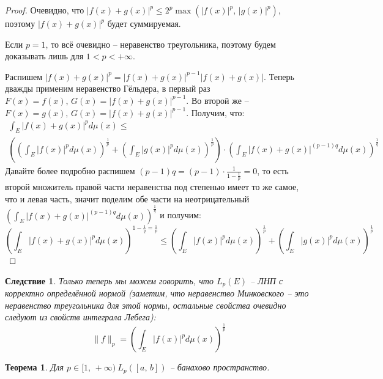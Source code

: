 \documentclass[a4paper,12pt]{article}
\renewcommand{\leq}{\ensuremath{\leqslant}}
\theoremstyle{plain}
\newtheorem{theorem}{Теорема}[section]
\newtheorem*{corollary}{Следствие}
\theoremstyle{definition}
\theoremstyle{remark}
\begin{document}
\begin{proof}
	Очевидно, что $|f(x) + g(x)|^p \leq 2^p \max(|f(x)|^p,\, |g(x)|^p)$, поэтому $|f(x) + g(x)|^p$ будет суммируемая.

	Если $p = 1$, то всё очевидно -- неравенство треугольника, поэтому будем доказывать лишь для $1 < p < +\infty$.

	Распишем $|f(x) + g(x)|^p = |f(x) + g(x)|^{p - 1}|f(x) + g(x)|$. Теперь дважды применим неравенство Гёльдера, в первый раз $F(x) = f(x),\, G(x) = |f(x) + g(x)|^{p - 1}$. Во второй же -- $F(x) = g(x),\, G(x) = |f(x) + g(x)|^{p - 1}$. Получим, что:
	\begin{align*}
		\int_E |f(x) + g(x)|^p d\mu(x) \leq \\
		\left(\left(\int_E |f(x)|^pd\mu(x)\right)^{\frac{1}{p}} + \left(\int_E |g(x)|^pd\mu(x)\right)^{\frac{1}{p}}\right) \cdot \left(\int_E |f(x) + g(x)|^{(p - 1)q}d\mu(x)\right)^{\frac{1}{q}}
	\end{align*}
	Давайте более подробно распишем $(p - 1)q = (p - 1)\cdot\frac{1}{1 - \frac{1}{p}} = 0$, то есть второй множитель правой части неравенства под степенью имеет то же самое, что и левая часть, значит поделим обе части на неотрицательный $\left(\int_E |f(x) + g(x)|^{(p - 1)q}d\mu(x)\right)^{\frac{1}{q}}$ и получим:
	\[\left(\int_E |f(x) + g(x)|^p d\mu(x)\right)^{1 - \frac{1}{q} = \frac{1}{p}} \leq \left(\int_E |f(x)|^pd\mu(x)\right)^{\frac{1}{p}} + \left(\int_E |g(x)|^pd\mu(x)\right)^{\frac{1}{p}}\]
\end{proof}

\begin{corollary}
	Только теперь мы можем говорить, что $L_p(E)$ -- ЛНП с корректно определённой нормой (заметим, что неравенство Минковского -- это неравенство треугольника для этой нормы, остальные свойства очевидно следуют из свойств интеграла Лебега):
	\[\|f\|_p = \left(\int_E |f(x)|^p d\mu(x)\right)^{\frac{1}{p}}\]
\end{corollary}

\begin{theorem}
	Для $p \in [1,\,+\infty) \: L_p([a,\,b])$ -- банахово пространство.
\end{theorem}
\end{document}
